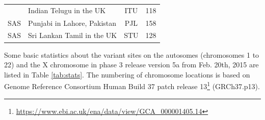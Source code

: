 \documentclass[]{book}
\let\rmarkdownfootnote\footnote%
\def\footnote{\protect\rmarkdownfootnote}
\renewcommand{\href}[2]{#2\footnote{\url{#1}}}
\theoremstyle{definition}
\theoremstyle{definition}
\theoremstyle{definition}
\theoremstyle{remark}
\begin{document}
\begin{longtable}[]{@{}clcc@{}}
\begin{minipage}[t]{0.14\columnwidth}
\end{minipage} & \begin{minipage}[t]{0.59\columnwidth}\raggedright\strut
Indian Telugu in the UK\strut
\end{minipage} & \begin{minipage}[t]{0.09\columnwidth}\centering\strut
ITU\strut
\end{minipage} & \begin{minipage}[t]{0.07\columnwidth}\centering\strut
118\strut
\end{minipage}\tabularnewline
\begin{minipage}[t]{0.14\columnwidth}\centering\strut
SAS\strut
\end{minipage} & \begin{minipage}[t]{0.59\columnwidth}\raggedright\strut
Punjabi in Lahore, Pakistan\strut
\end{minipage} & \begin{minipage}[t]{0.09\columnwidth}\centering\strut
PJL\strut
\end{minipage} & \begin{minipage}[t]{0.07\columnwidth}\centering\strut
158\strut
\end{minipage}\tabularnewline
\begin{minipage}[t]{0.14\columnwidth}\centering\strut
SAS\strut
\end{minipage} & \begin{minipage}[t]{0.59\columnwidth}\raggedright\strut
Sri Lankan Tamil in the UK\strut
\end{minipage} & \begin{minipage}[t]{0.09\columnwidth}\centering\strut
STU\strut
\end{minipage} & \begin{minipage}[t]{0.07\columnwidth}\centering\strut
128\strut
\end{minipage}\tabularnewline
\bottomrule
\end{longtable}

Some basic statistics about the variant sites on the autosomes
(chromosomes 1 to 22) and the X chromosome in phase 3 release version 5a
from Feb. 20th, 2015 are listed in Table \ref{tab:stats}. The numbering
of chromosome locations is based on
\href{https://www.ebi.ac.uk/ena/data/view/GCA_000001405.14}{Genome
Reference Consortium Human Build 37 patch release 13} (GRCh37.p13).
\end{document}
